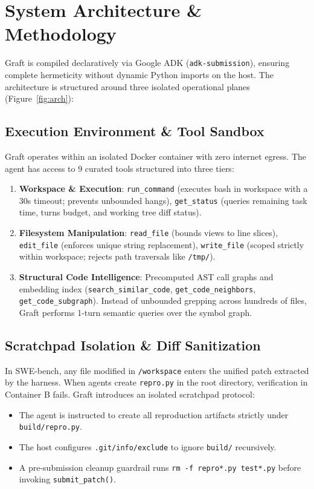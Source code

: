 \documentclass[10pt,twocolumn,letterpaper]{article}
\begin{document}
\section{System Architecture \& Methodology}

Graft is compiled declaratively via Google ADK (\texttt{adk-submission}), ensuring complete hermeticity without dynamic Python imports on the host. The architecture is structured around three isolated operational planes (Figure~\ref{fig:arch}):

\subsection{Execution Environment \& Tool Sandbox}
Graft operates within an isolated Docker container with zero internet egress. The agent has access to 9 curated tools structured into three tiers:
\begin{enumerate}
    \item \textbf{Workspace \& Execution}: \texttt{run\_command} (executes bash in workspace with a 30s timeout; prevents unbounded hangs), \texttt{get\_status} (queries remaining task time, turns budget, and working tree diff status).
    \item \textbf{Filesystem Manipulation}: \texttt{read\_file} (bounds views to line slices), \texttt{edit\_file} (enforces unique string replacement), \texttt{write\_file} (scoped strictly within workspace; rejects path traversals like \texttt{/tmp/}).
    \item \textbf{Structural Code Intelligence}: Precomputed AST call graphs and embedding index (\texttt{search\_similar\_code}, \texttt{get\_code\_neighbors}, \texttt{get\_code\_subgraph}). Instead of unbounded grepping across hundreds of files, Graft performs 1-turn semantic queries over the symbol graph.
\end{enumerate}

\subsection{Scratchpad Isolation \& Diff Sanitization}
In SWE-bench, any file modified in \texttt{/workspace} enters the unified patch extracted by the harness. When agents create \texttt{repro.py} in the root directory, verification in Container B fails. Graft introduces an isolated scratchpad protocol:
\begin{itemize}
    \item The agent is instructed to create all reproduction artifacts strictly under \texttt{build/repro.py}.
    \item The host configures \texttt{.git/info/exclude} to ignore \texttt{build/} recursively.
    \item A pre-submission cleanup guardrail runs \texttt{rm -f repro*.py test*.py} before invoking \texttt{submit\_patch()}.
\end{itemize}
\end{document}
